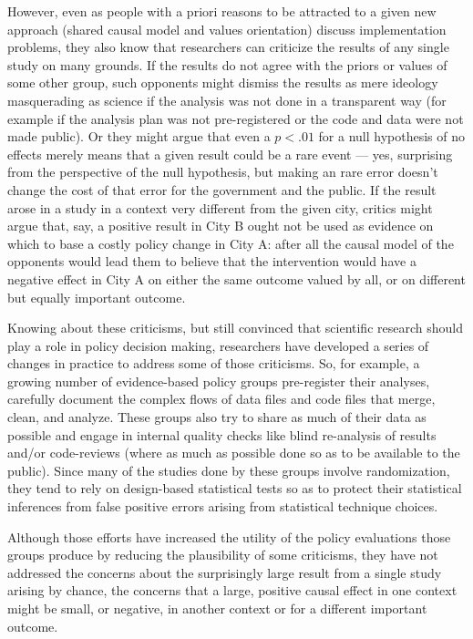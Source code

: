 \documentclass[
  11pt,
]{article}
\begin{document}
However, even as people with a priori reasons to be attracted to a given
new approach (shared causal model and values orientation) discuss
implementation problems, they also know that researchers can criticize
the results of any single study on many grounds. If the results do not
agree with the priors or values of some other group, such opponents
might dismiss the results as mere ideology masquerading as science if
the analysis was not done in a transparent way (for example if the
analysis plan was not pre-registered or the code and data were not made
public). Or they might argue that even a \(p < .01\) for a null
hypothesis of no effects merely means that a given result could be a
rare event --- yes, surprising from the perspective of the null
hypothesis, but making an rare error doesn't change the cost of that
error for the government and the public. If the result arose in a study
in a context very different from the given city, critics might argue
that, say, a positive result in City B ought not be used as evidence on
which to base a costly policy change in City A: after all the causal
model of the opponents would lead them to believe that the intervention
would have a negative effect in City A on either the same outcome valued
by all, or on different but equally important outcome.

Knowing about these criticisms, but still convinced that scientific
research should play a role in policy decision making, researchers have
developed a series of changes in practice to address some of those
criticisms. So, for example, a growing number of evidence-based policy
groups pre-register their analyses, carefully document the complex flows
of data files and code files that merge, clean, and analyze. These
groups also try to share as much of their data as possible and engage in
internal quality checks like blind re-analysis of results and/or
code-reviews (where as much as possible done so as to be available to
the public). Since many of the studies done by these groups involve
randomization, they tend to rely on design-based statistical tests so as
to protect their statistical inferences from false positive errors
arising from statistical technique choices.

Although those efforts have increased the utility of the policy
evaluations those groups produce by reducing the plausibility of some
criticisms, they have not addressed the concerns about the surprisingly
large result from a single study arising by chance, the concerns that a
large, positive causal effect in one context might be small, or
negative, in another context or for a different important outcome.
\end{document}
